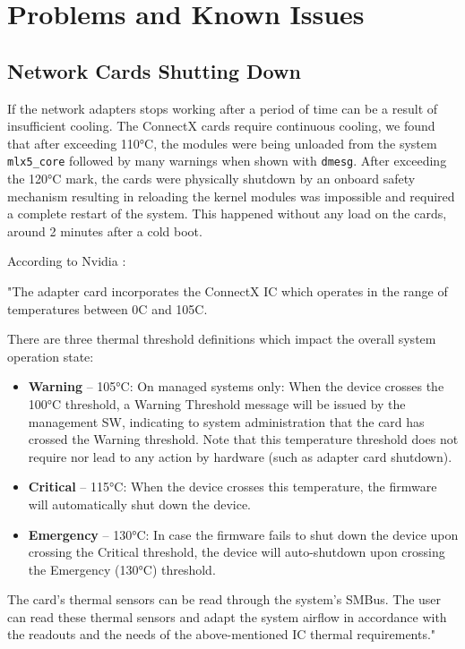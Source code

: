 \documentclass[a4paper,onecolumn]{article}
\begin{document}
\section{Problems and Known Issues}

\subsection{Network Cards Shutting Down}

If the network adapters stops working after a period of time can be a result of insufficient cooling. The ConnectX cards require continuous cooling, we found that after exceeding 110°C, the modules were being unloaded from the system \verb|mlx5_core| followed by many warnings when shown with \verb|dmesg|. After exceeding the 120°C mark, the cards were physically shutdown by an onboard safety mechanism resulting in reloading the kernel modules was impossible and required a complete restart of the system. This happened without any load on the cards, around 2 minutes after a cold boot.

According to Nvidia \cite{article_nvidia_thermal_sensors}:

"The adapter card incorporates the ConnectX IC which operates in the range of temperatures between 0C and 105C.

There are three thermal threshold definitions which impact the overall system operation state:
\begin{itemize}
\item \textbf{Warning} – 105°C: On managed systems only: When the device crosses the 100°C threshold, a Warning Threshold message will be issued by the management SW, indicating to system administration that the card has crossed the Warning threshold. Note that this temperature threshold does not require nor lead to any action by hardware (such as adapter card shutdown).
 
\item \textbf{Critical} – 115°C: When the device crosses this temperature, the firmware will automatically shut down the device.

\item \textbf{Emergency} – 130°C: In case the firmware fails to shut down the device upon crossing the Critical threshold, the device will auto-shutdown upon crossing the Emergency (130°C) threshold.
\end{itemize}

The card's thermal sensors can be read through the system’s SMBus. The user can read these thermal sensors and adapt the system airflow in accordance with the readouts and the needs of the above-mentioned IC thermal requirements."
\end{document}
